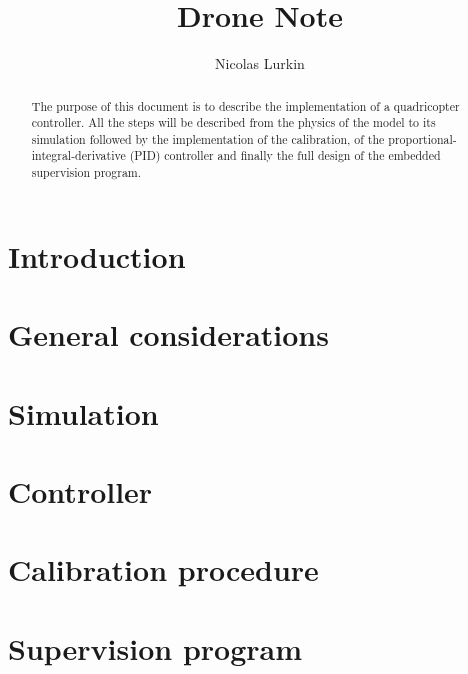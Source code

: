 \documentclass{article}
\title{Drone Note}
\author{Nicolas Lurkin}
\begin{document}
\maketitle

\begin{abstract}
The purpose of this document is to describe the implementation of a quadricopter
controller. All the steps will be described from the physics of the model to its
simulation followed by the implementation of the calibration, of the
proportional-integral-derivative (PID) controller and finally the full design of
the embedded supervision program.
\end{abstract}

\section{Introduction} 

\section{General considerations}


\section{Simulation}


\section{Controller}


\section{Calibration procedure}


\section{Supervision program}

\thebibliography{}
\end{document}
